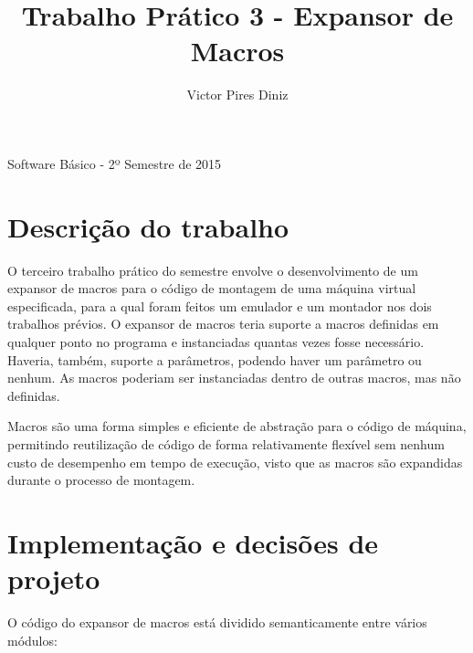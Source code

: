 \documentclass[12pt,a4paper]{article}
\title{Trabalho Prático 3 - Expansor de Macros}
\author{Victor Pires Diniz}
\numberwithin{equation}{section}
\begin{document}
\maketitle
\begin{center}
Software Básico - 2º Semestre de 2015
\end{center}

\section{Descrição do trabalho}

O terceiro trabalho prático do semestre envolve o desenvolvimento de um expansor de macros para o código de montagem de uma máquina virtual especificada, para a qual foram feitos um emulador e um montador nos dois trabalhos prévios. O expansor de macros teria suporte a macros definidas em qualquer ponto no programa e instanciadas quantas vezes fosse necessário. Haveria, também, suporte a parâmetros, podendo haver um parâmetro ou nenhum. As macros poderiam ser instanciadas dentro de outras macros, mas não definidas.

Macros são uma forma simples e eficiente de abstração para o código de máquina, permitindo reutilização de código de forma relativamente flexível sem nenhum custo de desempenho em tempo de execução, visto que as macros são expandidas durante o processo de montagem.

\section{Implementação e decisões de projeto}

O código do expansor de macros está dividido semanticamente entre vários módulos:
\end{document}
